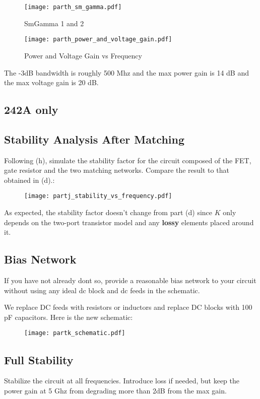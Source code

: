 \begin{figure}[H]
    \texttt{[image: parth\_sm\_gamma.pdf]}
    \caption{SmGamma 1 and 2}
    \endminipage\hfill
    \texttt{[image: parth\_power\_and\_voltage\_gain.pdf]}
    \caption{Power and Voltage Gain vs Frequency}
    \endminipage
\end{figure}

The -3dB bandwidth is roughly 500 Mhz and the max power gain is 14 dB and the max voltage gain is 20 dB.

\subsection{242A only}

\subsection{Stability Analysis After Matching}
{\color{blue} Following (h), simulate the stability factor for the circuit composed of the FET, gate resistor and the two matching networks. Compare the result to that obtained in (d).}:

\begin{figure}[H]
    \centering \texttt{[image: partj\_stability\_vs\_frequency.pdf]}
\end{figure}

As expected, the stability factor doesn't change from part (d) since $K$ only depends on the two-port transistor model and any \textbf{lossy} elements placed around it.

\subsection{Bias Network}
{\color{blue} If you have not already dont so, provide a reasonable bias network to your circuit without using any ideal dc block and dc feeds in the schematic.}

We replace DC feeds with resistors or inductors and replace DC blocks with 100 pF capacitors. Here is the new schematic:

\begin{figure}[H]
    \centering \texttt{[image: partk\_schematic.pdf]}
\end{figure}

\subsection{Full Stability}
{\color{blue} Stabilize the circuit at all frequencies. Introduce loss if needed, but keep the power gain at 5 Ghz from degrading more than 2dB from the max gain.}

